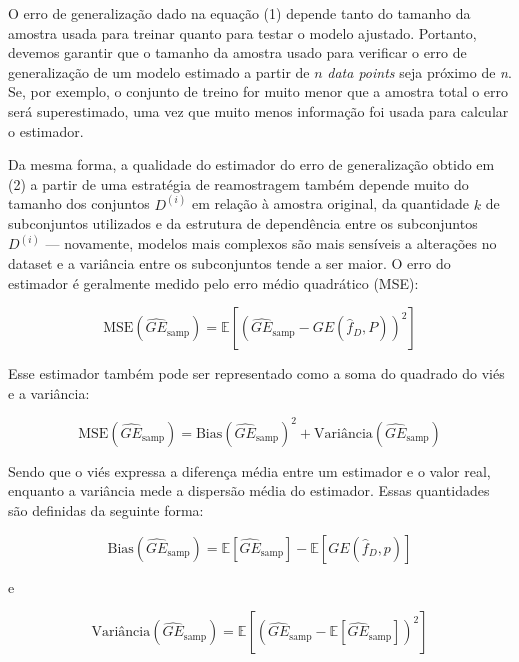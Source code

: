 \documentclass[
  12pt,
  oneside,
  a4paper,
  chapter=TITLE,
  section=TITLE,
  brazil]{abntex2}
\begin{document}
O erro de generalização dado na equação (1) depende tanto do tamanho da
amostra usada para treinar quanto para testar o modelo ajustado.
Portanto, devemos garantir que o tamanho da amostra usado para verificar
o erro de generalização de um modelo estimado a partir de \(n\)
\emph{data points} seja próximo de \emph{n}. Se, por exemplo, o conjunto
de treino for muito menor que a amostra total o erro será superestimado,
uma vez que muito menos informação foi usada para calcular o estimador.

Da mesma forma, a qualidade do estimador do erro de generalização obtido
em (2) a partir de uma estratégia de reamostragem também depende muito
do tamanho dos conjuntos \(D^{(i)}\) em relação à amostra original, da
quantidade \(k\) de subconjuntos utilizados e da estrutura de
dependência entre os subconjuntos \(D^{(i)}\) --- novamente, modelos
mais complexos são mais sensíveis a alterações no dataset e a variância
entre os subconjuntos tende a ser maior. O erro do estimador é
geralmente medido pelo erro médio quadrático (MSE):

\[\text{MSE}(\widehat{GE}_\text{samp}) = \mathbb{E}[(\widehat{GE}_\text{samp} - GE(\hat{f}_D, P))^2]\]

Esse estimador também pode ser representado como a soma do quadrado do
viés e a variância:

\[\text{MSE}(\widehat{GE}_\text{samp}) = \text{Bias}(\widehat{GE}_\text{samp})^2 + \text{Variância}(\widehat{GE}_\text{samp})\]

Sendo que o viés expressa a diferença média entre um estimador e o valor
real, enquanto a variância mede a dispersão média do estimador. Essas
quantidades são definidas da seguinte forma:

\[\text{Bias}(\widehat{GE}_\text{samp}) = \mathbb{E}[\widehat{GE}_\text{samp}] - \mathbb{E}[GE(\hat{f}_D, p)]\]

e

\[\text{Variância}(\widehat{GE}_\text{samp}) = \mathbb{E}[(\widehat{GE}_\text{samp} - \mathbb{E}[\widehat{GE}_\text{samp}])^2]\]


\printbibliography


\postextual
\end{document}

